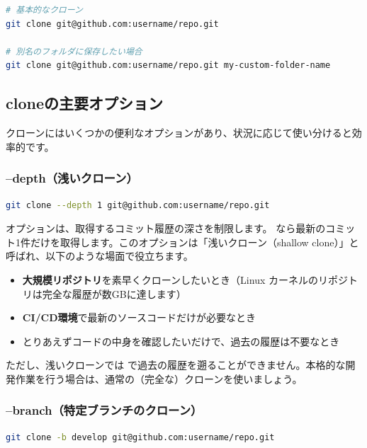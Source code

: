 \begin{lstlisting}[language=bash]
# 基本的なクローン
git clone git@github.com:username/repo.git

# 別名のフォルダに保存したい場合
git clone git@github.com:username/repo.git my-custom-folder-name
\end{lstlisting}

\subsection{cloneの主要オプション}

クローンにはいくつかの便利なオプションがあり、状況に応じて使い分けると効率的です。

\subsubsection{--depth（浅いクローン）}

\begin{lstlisting}[language=bash]
git clone --depth 1 git@github.com:username/repo.git
\end{lstlisting}

 オプションは、取得するコミット履歴の深さを制限します。 なら最新のコミット1件だけを取得します。このオプションは「浅いクローン（shallow clone）」と呼ばれ、以下のような場面で役立ちます。

\begin{itemize}
  \item \textbf{大規模リポジトリ}を素早くクローンしたいとき（Linux カーネルのリポジトリは完全な履歴が数GBに達します）
  \item \textbf{CI/CD環境}で最新のソースコードだけが必要なとき
  \item とりあえずコードの中身を確認したいだけで、過去の履歴は不要なとき
\end{itemize}

ただし、浅いクローンでは  で過去の履歴を遡ることができません。本格的な開発作業を行う場合は、通常の（完全な）クローンを使いましょう。

\subsubsection{--branch（特定ブランチのクローン）}

\begin{lstlisting}[language=bash]
git clone -b develop git@github.com:username/repo.git
\end{lstlisting}

